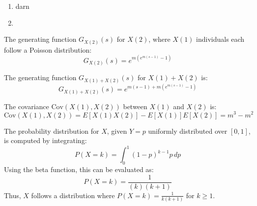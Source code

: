 \begin{enumerate}[label=(\alph*)]
\begin{enumerate}
    \item darn
    \item 
\end{enumerate}

The generating function \( G_{X(2)}(s) \) for \( X(2) \), where \( X(1) \) individuals each follow a Poisson distribution:
\[ G_{X(2)}(s) = e^{m(e^{m(s-1)}-1)} \]

The generating function \( G_{X(1) + X(2)}(s) \) for \( X(1) + X(2) \) is:
\[ G_{X(1)+X(2)}(s) = e^{m(s-1) + m(e^{m(s-1)}-1)} \]

The covariance \( \text{Cov}(X(1), X(2)) \) between \( X(1) \) and \( X(2) \) is:
\[ \text{Cov}(X(1), X(2)) = E[X(1)X(2)] - E[X(1)]E[X(2)] = m^3 - m^2 \]
\end{enumerate}


\solution

The probability distribution for \( X \), given \( Y = p \) uniformly distributed over \([0,1]\), is computed by integrating:
\[ P(X = k) = \int_0^1 (1-p)^{k-1} p \, dp \]
Using the beta function, this can be evaluated as:
\[ P(X = k) = \frac{1}{(k)(k+1)} \]
Thus, \( X \) follows a distribution where \( P(X = k) = \frac{1}{k(k+1)} \) for \( k \geq 1 \).

